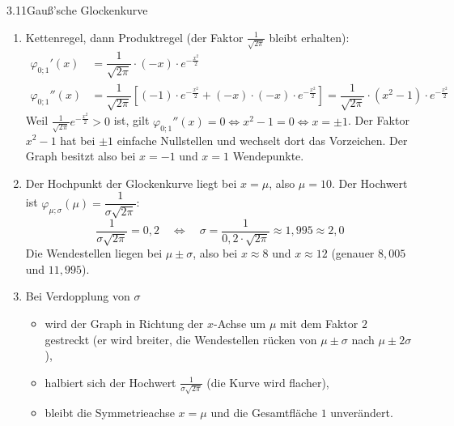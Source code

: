 \begin{loesung}{3.11}{Gauß'sche Glockenkurve}
\begin{enumerate}[label=\alph*)]
  \item Kettenregel, dann Produktregel (der Faktor $\frac{1}{\sqrt{2\pi}}$ bleibt erhalten):
  \begin{align*}
    \varphi_{0;1}'(x) &= \dfrac{1}{\sqrt{2\pi}}\cdot(-x)\cdot e^{-\frac{x^2}{2}}\\
    \varphi_{0;1}''(x) &= \dfrac{1}{\sqrt{2\pi}}\left[(-1)\cdot e^{-\frac{x^2}{2}}+(-x)\cdot(-x)\cdot e^{-\frac{x^2}{2}}\right] = \dfrac{1}{\sqrt{2\pi}}\cdot(x^2-1)\cdot e^{-\frac{x^2}{2}}
  \end{align*}
  Weil $\frac{1}{\sqrt{2\pi}}e^{-\frac{x^2}{2}}>0$ ist, gilt $\varphi_{0;1}''(x)=0\Longleftrightarrow x^2-1=0\Longleftrightarrow x=\pm 1$. Der Faktor $x^2-1$ hat bei $\pm 1$ einfache Nullstellen und wechselt dort das Vorzeichen. Der Graph besitzt also bei $x=-1$ und $x=1$ Wendepunkte.
  \item Der Hochpunkt der Glockenkurve liegt bei $x=\mu$, also $\mu = 10$. Der Hochwert ist $\varphi_{\mu;\sigma}(\mu) = \dfrac{1}{\sigma\sqrt{2\pi}}$:
  \[\dfrac{1}{\sigma\sqrt{2\pi}} = 0{,}2\quad\Longleftrightarrow\quad\sigma = \dfrac{1}{0{,}2\cdot\sqrt{2\pi}}\approx 1{,}995\approx 2{,}0\]
  Die Wendestellen liegen bei $\mu\pm\sigma$, also bei $x\approx 8$ und $x\approx 12$ (genauer $8{,}005$ und $11{,}995$).
  \item Bei Verdopplung von $\sigma$
  \begin{itemize}
    \item wird der Graph in Richtung der $x$-Achse um $\mu$ mit dem Faktor $2$ gestreckt (er wird breiter, die Wendestellen rücken von $\mu\pm\sigma$ nach $\mu\pm 2\sigma$),
    \item halbiert sich der Hochwert $\frac{1}{\sigma\sqrt{2\pi}}$ (die Kurve wird flacher),
    \item bleibt die Symmetrieachse $x=\mu$ und die Gesamtfläche $1$ unverändert.
  \end{itemize}
\end{enumerate}
\end{loesung}

